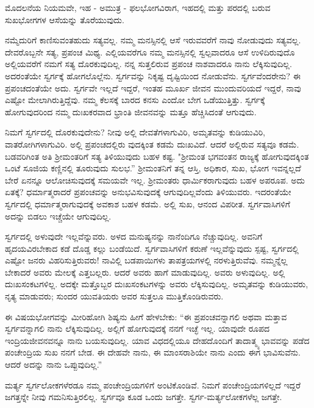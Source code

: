 ಮೊದಲನೆಯ ನಿಯಮವೇ, ಇಹ - ಅಮುತ್ರ - ಫಲಭೋಗವಿರಾಗ, ಇಹದಲ್ಲಿ ಮತ್ತು ಪರದಲ್ಲಿ ಬರುವ ಸುಖಭೋಗಗಳ ಆಸೆಯನ್ನು ತೊರೆಯುವುದು.

ನಮ್ಮೆದುರಿಗೆ ಕಾಣಿಸುವಂತಹುದು ಸತ್ಯವಲ್ಲ. ನಮ್ಮ ಮನಸ್ಸಿನಲ್ಲಿ ಆಸೆ ಇರುವವರೆಗೆ ನಾವು ನೋಡುವುದು ಸತ್ಯವಲ್ಲ. ದೇವರೊಬ್ಬನೇ ಸತ್ಯ, ಪ್ರಪಂಚ ಮಿಥ್ಯ. ಎಲ್ಲಿಯವರೆಗೂ ನಮ್ಮ ಮನಸ್ಸಿನಲ್ಲಿ ಸ್ವಲ್ಪವಾದರೂ ಆಸೆ ಉಳಿದಿರುವುದೊ ಅಲ್ಲಿಯವರೆಗೆ ನಮಗೆ ಸತ್ಯ ದೊರಕುವುದಿಲ್ಲ. ನನ್ನ ಸುತ್ತಲಿರುವ ಪ್ರಪಂಚ ನಾಶವಾದರೂ ನಾನು ಲೆಕ್ಕಿಸುವುದಿಲ್ಲ. ಅದರಂತೆಯೇ ಸ್ವರ್ಗಕ್ಕೆ ಹೋಗಲೊಲ್ಲೆನು. ಸ್ವರ್ಗವನ್ನು ನಿಕೃಷ್ಟ ದೃಷ್ಟಿಯಿಂದ ನೋಡುವೆನು. ಸ್ವರ್ಗವೆಂದರೇನು? ಈ ಪ್ರಪಂಚದಂತೆಯೇ ಅದು. ಸ್ವರ್ಗವೇ ಇಲ್ಲದೆ ಇದ್ದರೆ, ಇಂತಹ ಮೂರ್ಖ ಜೀವನ ಮುಂದುವರಿಯದೆ ಇದ್ದರೆ, ನಾವು ಎಷ್ಟೋ ಮೇಲಾಗಿರುತ್ತಿದ್ದೆವು. ನಮ್ಮ ಕೆಲಸಕ್ಕೆ ಬಾರದ ಕನಸು ಎಂದೋ ಬೇಗ ಒಡೆಯುತ್ತಿತ್ತು. ಸ್ವರ್ಗಕ್ಕೆ ಹೋಗುವುದರಿಂದ ನಮ್ಮ ದುಃಖಕರವಾದ ಭ್ರಾಂತಿ ಜೀವನವನ್ನು ಮತ್ತೂ ಹೆಚ್ಚಿಸಿದಂತೆ ಆಗುವುದು.

ನಿಮಗೆ ಸ್ವರ್ಗದಲ್ಲಿ ದೊರಕುವುದೇನು? ನೀವು ಅಲ್ಲಿ ದೇವತೆಗಳಾಗುವಿರಿ, ಅಮೃತವನ್ನು ಕುಡಿಯುವಿರಿ, ವಾತರೋಗಿಗಳಾಗುವಿರಿ. ಅಲ್ಲಿ ಪ್ರಪಂಚದಲ್ಲಿರು ವುದಕ್ಕಿಂತ ಕಡಮೆ ದುಃಖವಿದೆ. ಆದರೆ ಅಲ್ಲಿರುವ ಸತ್ಯವೂ ಕಡಮೆ. ಬಡವರಿಗಿಂತ ಅತಿ ಶ‍್ರೀಮಂತರಿಗೆ ಸತ್ಯ ತಿಳಿಯುವುದು ಬಹಳ ಕಷ್ಟ. "ಶ‍್ರೀಮಂತ ಭಗವಂತನ ರಾಜ್ಯಕ್ಕೆ ಹೋಗುವುದಕ್ಕಿಂತ ಒಂಟೆ ಸೂಜಿಯ ಕಣ್ಣಿನಲ್ಲಿ ತೂರುವುದು ಸುಲಭ.'' ಶ‍್ರೀಮಂತನಿಗೆ ತನ್ನ ಆಸ್ತಿ, ಅಧಿಕಾರ, ಸುಖ, ಭೋಗ ಇವನ್ನಲ್ಲದೆ ಬೇರೆ ಏನನ್ನೂ ಆಲೋಚಿಸುವುದಕ್ಕೆ ಸಮಯವೇ ಇಲ್ಲ. ಶ‍್ರೀಮಂತರು ಧಾರ್ಮಿಕರಾಗುವುದು ಬಹಳ ಅಪರೂಪ. ಅದು ಏತಕ್ಕೆ? ಧರ್ಮಾತ್ಮರಾದರೆ ಪ್ರಪಂಚವನ್ನು ಅನುಭವಿಸುವುದಕ್ಕೆ ಆಗುವುದಿಲ್ಲವೆಂದು ತಿಳಿಯುವರು. ಇದರಂತೆಯೇ ಸ್ವರ್ಗದಲ್ಲಿ ಧರ್ಮಾತ್ಮರಾಗುವುದಕ್ಕೆ ಅವಕಾಶ ಬಹಳ ಕಡಮೆ. ಅಲ್ಲಿ ಸುಖ, ಆನಂದ ವಿಪರೀತ. ಸ್ವರ್ಗವಾಸಿಗಳಿಗೆ ಅದನ್ನು ಬಿಡಲು ಇಚ್ಚೆಯೇ ಆಗುವುದಿಲ್ಲ.

ಸ್ವರ್ಗದಲ್ಲಿ ಅಳುವುದೇ ಇಲ್ಲವೆನ್ನುವರು. ಅಳದ ಮನುಷ್ಯನನ್ನು ನಾನೆಂದಿಗೂ ನೆಚ್ಚುವುದಿಲ್ಲ. ಅವನಿಗೆ ಹೃದಯವಿರಬೇಕಾದ ಕಡೆ ದೊಡ್ಡ ಕಲ್ಲು ಬಂಡೆಯಿದೆ. ಸ್ವರ್ಗವಾಸಿಗಳಿಗೆ ಕರುಣೆ ಇಲ್ಲವೆನ್ನುವುದು ಸ್ಪಷ್ಟ, ಸ್ವರ್ಗದಲ್ಲಿ ಎಷ್ಟೋ ಜನರು ವಿಹರಿಸುತ್ತಿರುವರು! ನಾವಿಲ್ಲಿ ಬಡಪಾಯಿಗಳು ತಾಪತ್ರಯಗಳಲ್ಲಿ ನರಳುತ್ತಿರುವೆವು. ನಮ್ಮನ್ನೆಲ್ಲ ಬೇಕಾದರೆ ಅವರು ಮೇಲಕ್ಕೆ ಎತ್ತಬಲ್ಲರು. ಆದರೆ ಅವರು ಹಾಗೆ ಮಾಡುವುದಿಲ್ಲ. ಅವರು ಅಳುವುದಿಲ್ಲ. ಅಲ್ಲಿ ದುಃಖಸಂಕಟಗಳಿಲ್ಲ. ಅದಕ್ಕೇ ಮತ್ತೊಬ್ಬರ ದುಃಖಸಂಕಟಗಳನ್ನು ಅವರು ಲೆಕ್ಕಿಸುವುದಿಲ್ಲ. ಅಮೃತವನ್ನು ಕುಡಿಯುವರು, ನೃತ್ಯ ಮಾಡುವರು; ಸುಂದರ ಯುವತಿಯರು ಅವರ ಸುತ್ತಲೂ ಮುತ್ತಿಕೊಂಡಿರುವರು.

ಈ ವಿಷಯಭೋಗವನ್ನು ಮೀರಿಹೋಗಿ ಶಿಷ್ಯನು ಹೀಗೆ ಹೇಳಬೇಕು: “ಈ ಪ್ರಪಂಚವನ್ನಾಗಲಿ ಅಥವಾ ಮತ್ತಾವ ಸ್ವರ್ಗವನ್ನಾಗಲಿ ನಾನು ಲೆಕ್ಕಿಸುವುದಿಲ್ಲ. ಅಲ್ಲಿಗೆ ಹೋಗುವುದಕ್ಕೆ ನನಗೆ ಇಚ್ಛೆ ಇಲ್ಲ. ಯಾವುದೇ ರೂಪದ ಇಂದ್ರಿಯಜೀವನವನ್ನೂ ನಾನು ಬಯಸುವುದಿಲ್ಲ. ಯಾವ ವಿಧದಲ್ಲಿಯೂ ದೇಹದೊಂದಿಗೆ ತಾದಾತ್ಮ್ಯ ಭಾವವನ್ನು ಪಡೆದ ಪಂಚೇಂದ್ರಿಯ ಸುಖ ನನಗೆ ಬೇಡ. ಈ ದೇಹವೇ ನಾನು, ಈ ಮಾಂಸರಾಶಿಯೇ ನಾನು ಎಂದು ಈಗ ಭಾವಿಸುವೆನು. ಆದರೆ ಅದನ್ನು ನಾನು ಒಪ್ಪುವುದಿಲ್ಲ.”

ಮರ್ತ್ಯ ಸ್ವರ್ಗಲೋಕಗಳೆರಡೂ ನಮ್ಮ ಪಂಚೇಂದ್ರಿಯಗಳಿಗೆ ಅಂಟಿಕೊಂಡಿವೆ. ನಿಮಗೆ ಪಂಚೇಂದ್ರಿಯಗಳಿಲ್ಲದೆ ಇದ್ದರೆ ಜಗತ್ತನ್ನೇ ನೀವು ಗಮನಿಸುತ್ತಿರಲಿಲ್ಲ. ಸ್ವರ್ಗವೂ ಕೂಡ ಒಂದು ಜಗತ್ತೇ. ಸ್ವರ್ಗ-ಮರ್ತ್ಯಲೋಕಗಳೆಲ್ಲ ಜಗತ್ತೇ.

